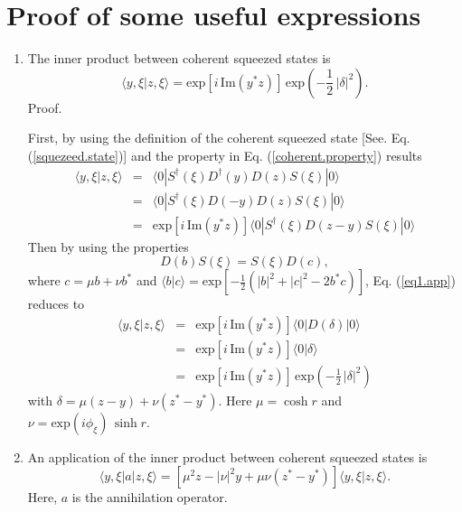 \documentclass[aps,pra,preprint,superscriptaddress, showpacs]{revtex4-2}
\begin{document}
\section{Proof of some useful expressions}
\begin{enumerate}
	\item The inner product between coherent squeezed states is
	\begin{equation}\label{inner.product.squeezed.state}
	\langle y, \xi|z, \xi \rangle=\textrm{exp}\left[i\,\textrm{Im}(y^{*}z)\right]\,\textrm{exp}\left(-\frac{1}{2}\,|\delta|^2\right).
	\end{equation} 
	Proof.
	
	First, by using the definition of the coherent squeezed state [See. Eq. (\ref{squezeed.state})] and the property in Eq. (\ref{coherent.property}) results
	\begin{eqnarray}\label{eq1.app}
	\langle y, \xi|z, \xi \rangle &=& \langle 0|S^{\dagger}(\xi)D^{\dagger}(y)D(z)S(\xi)|0\rangle\nonumber\\
	&=&	\langle 0|S^{\dagger}(\xi)D(-y)D(z)S(\xi)|0\rangle\nonumber\\
	&=&\textrm{exp}\left[i\,\textrm{Im}\left(y^{*}z\right)\right]\langle 0|S^{\dagger}(\xi)D(z-y)S(\xi)|0\rangle
	\end{eqnarray}
	Then by using the properties \cite{orszag2016quantum}
	\begin{equation}
	D(b)S(\xi)=S(\xi)D(c),
	\end{equation}
	where $c=\mu b+\nu b^{*}$ and $\langle b|c \rangle=\textrm{exp}\left[-\frac{1}{2}\left(|b|^2+|c|^2-2b^{*}c\right)\right]$, Eq. (\ref{eq1.app}) reduces to
	\begin{eqnarray}
	\langle y, \xi|z, \xi \rangle &=&\textrm{exp}\left[i\,\textrm{Im}\left(y^{*}z\right)\right]\langle 0|D(\delta)|0\rangle\nonumber\\
	&=&\textrm{exp}\left[i\,\textrm{Im}\left(y^{*}z\right)\right]\langle 0|\delta\rangle\nonumber\\
	&=&\textrm{exp}\left[i\,\textrm{Im}\left(y^{*}z\right)\right]\,\textrm{exp}\left(-\frac{1}{2}\,|\delta|^2\right)
	\end{eqnarray}
	with 
	$\delta=\mu(z-y)+\nu(z^{*}-y^{*})$. Here $\mu=\cosh{r}$ and $\nu=\textrm{exp}\left(i\phi_{\xi}\right)\,\sinh{r}$.
	
	\item An application of the inner product between coherent squeezed states is
	\begin{equation}\label{special.inner.product}
	\langle y, \xi|a|z, \xi\rangle=\left[\mu^{2} z-|\nu|^2 y+\mu\nu(z^{*}-y^{*})\right]\langle y, \xi|z, \xi \rangle.
	\end{equation}
	Here, $a$ is the annihilation operator.
	

\end{enumerate}
\end{document}
